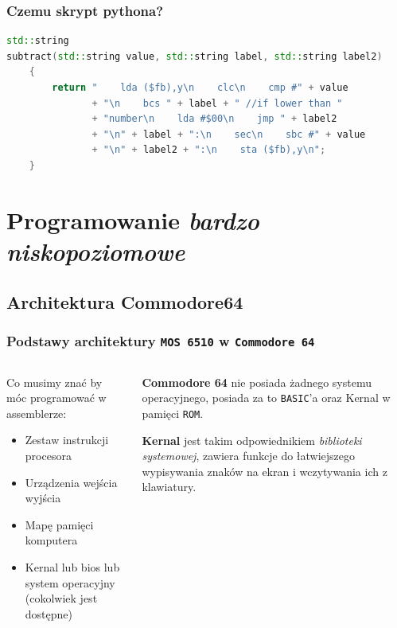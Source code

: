 \documentclass[aspectratio=169]{beamer}
\begin{document}
\begin{frame}[fragile]
    \frametitle{Czemu skrypt pythona?}
    \begin{lstlisting}[language=c++,style=asm,showstringspaces=false,stringstyle=\color{red},identifierstyle=\color{blue},firstnumber=69]
std::string
subtract(std::string value, std::string label, std::string label2)
    {
        return "    lda ($fb),y\n    clc\n    cmp #" + value
               + "\n    bcs " + label + " //if lower than "
               + "number\n    lda #$00\n    jmp " + label2
               + "\n" + label + ":\n    sec\n    sbc #" + value
               + "\n" + label2 + ":\n    sta ($fb),y\n";
    }
        \end{lstlisting}
\end{frame}
\section{Programowanie \emph{bardzo niskopoziomowe}}
\subsection{Architektura Commodore64}
\begin{frame}
    \frametitle{Podstawy architektury \texttt{MOS 6510} w \texttt{Commodore 64}}
    \begin{columns}
        \begin{column}{0.5\textwidth}
            Co musimy znać by móc programować w assemblerze: \pause
            \begin{itemize}
                \item Zestaw instrukcji procesora \pause
                \item Urządzenia wejścia wyjścia \pause
                \item Mapę pamięci komputera \pause
                \item Kernal lub bios lub system operacyjny (cokolwiek jest dostępne) \pause
            \end{itemize}
        \end{column}
        \begin{column}{0.5\textwidth}
            \textbf{Commodore 64} nie posiada żadnego systemu operacyjnego, posiada za to \texttt{BASIC}'a oraz Kernal w pamięci \texttt{ROM}.

            \pause \vspace{5mm}

            \textbf{Kernal} jest takim odpowiednikiem \emph{biblioteki systemowej}, zawiera funkcje do łatwiejszego wypisywania znaków na ekran i wczytywania ich z klawiatury.
        \end{column}
    \end{columns}
\end{frame}
\end{document}
